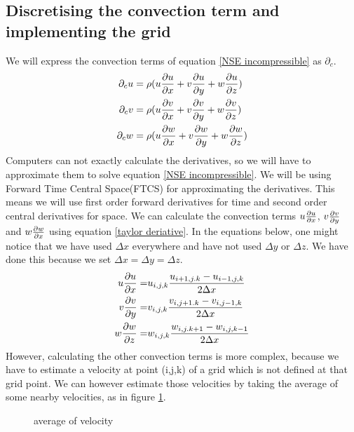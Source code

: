 \documentclass{article}
\begin{document}
\subsection{Discretising the convection term and implementing the grid}
We will express the convection terms of equation \ref{NSE incompressible} as \(\partial _{c}\)\cite{MAC}.
\begin{equation}
\begin{split}
  \partial _cu=\rho(&u\pdv{u}{x}+v\pdv{u}{y}+w\pdv{u}{z})\\
  \partial _cv=\rho(&u\pdv{v}{x}+v\pdv{v}{y}+w\pdv{v}{z})\\
  \partial _cw=\rho(&u\pdv{w}{x}+v\pdv{w}{y}+w\pdv{w}{z})
\end{split}\label{convection terms}
\end{equation}
Computers can not exactly calculate the derivatives, so we will have to approximate them to solve equation \ref{NSE incompressible}. We will be using Forward Time Central Space(FTCS) for approximating the derivatives\cite{MAC}. This means we will use first order forward derivatives for time and second order central derivatives for space. We can calculate the convection terms \(u\pdv{u}{x}\), \(v\pdv{v}{y}\) and \(w\pdv{w}{x}\)  using equation \ref{taylor deriative}. In the equations below, one might notice that we have used \(\Delta x\) everywhere and have not used \(\Delta y\) or \(\Delta z\). We have done this because we set \(\Delta x = \Delta y = \Delta z\). 
\[\begin{split}
  u\pdv{u}{x}=& u_{i,j,k}\frac{u_{i+1,j.k}-u_{i-1,j,k}}{2\Delta x}\\
  v\pdv{v}{y}=& v_{i,j,k}\frac{v_{i,j+1.k}-v_{i,j-1,k}}{2\Delta x}\\
  w\pdv{w}{z}=& w_{i,j,k}\frac{w_{i,j.k+1}-w_{i,j,k-1}}{2\Delta x}
\end{split}\]
However, calculating the other convection terms is more complex, because we have to estimate a velocity at point (i,j,k) of a grid which is not defined at that grid point. We can however estimate those velocities by taking the average of some nearby velocities, as in figure \ref{velocity to other grid}\cite{MAC}.
\begin{figure}[h]
\centering

\caption{average of velocity} \label{velocity to other grid}
\end{figure}
\end{document}
